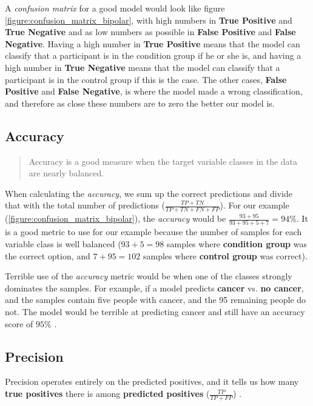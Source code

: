 A \textit{confusion matrix} for a good model would look like figure \ref{figure:confusion_matrix_bipolar}, with high numbers in \textbf{True Positive} and \textbf{True Negative} and as low numbers as possible in \textbf{False Positive} and \textbf{False Negative}. Having a high number in \textbf{True Positive} means that the model can classify that a participant is in the condition group if he or she is, and having a high number in \textbf{True Negative} means that the model can classify that a participant is in the control group if this is the case. The other cases, \textbf{False Positive} and \textbf{False Negative}, is where the model made a wrong classification, and therefore as close these numbers are to zero the better our model is.

\subsection{Accuracy}

\blockquote[\cite{ml_metrics}]{Accuracy is a good measure when the target variable classes in the data are nearly balanced.}

When calculating the \textit{accuracy}, we sum up the correct predictions and divide that with the total number of predictions ($ \frac{TP + TN}{TP + TN + FN + FP} $). For our example (\ref{figure:confusion_matrix_bipolar}), the \textit{accuracy} would be $ \frac{93 + 95}{93 + 95 + 5 + 7} = 94\% $. It is a good metric to use for our example because the number of samples for each variable class is well balanced ($ 93+5=98 $ samples where \textbf{condition group} was the correct option, and $ 7+95=102 $ samples where \textbf{control group} was correct).

Terrible use of the \textit{accuracy} metric would be when one of the classes strongly dominates the samples. For example, if a model predicts \textbf{cancer} vs. \textbf{no cancer}, and the samples contain five people with cancer, and the 95 remaining people do not. The model would be terrible at predicting cancer and still have an accuracy score of $ 95\% $ \cite{ml_metrics}.

\subsection{Precision} 

Precision operates entirely on the predicted positives, and it tells us how many \textbf{true positives} there is among \textbf{predicted positives} ($ \frac{TP}{TP + FP} $) \cite{ml_metrics}. 

